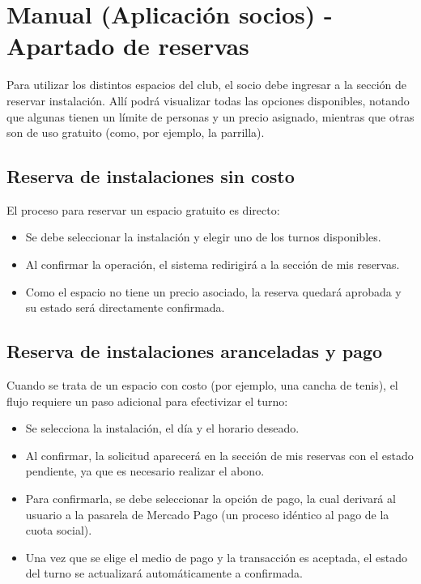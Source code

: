 \section{Manual (Aplicación socios) - Apartado de reservas}

Para utilizar los distintos espacios del club, el socio debe ingresar a la sección de reservar instalación. Allí podrá visualizar todas las opciones disponibles, notando que algunas tienen un límite de personas y un precio asignado, mientras que otras son de uso gratuito (como, por ejemplo, la parrilla).

\subsection{Reserva de instalaciones sin costo}
El proceso para reservar un espacio gratuito es directo:
\begin{itemize}
    \item Se debe seleccionar la instalación y elegir uno de los turnos disponibles.
    \item Al confirmar la operación, el sistema redirigirá a la sección de mis reservas.
    \item Como el espacio no tiene un precio asociado, la reserva quedará aprobada y su estado será directamente confirmada.
\end{itemize}

\subsection{Reserva de instalaciones aranceladas y pago}
Cuando se trata de un espacio con costo (por ejemplo, una cancha de tenis), el flujo requiere un paso adicional para efectivizar el turno:
\begin{itemize}
    \item Se selecciona la instalación, el día y el horario deseado.
    \item Al confirmar, la solicitud aparecerá en la sección de mis reservas con el estado pendiente, ya que es necesario realizar el abono.
    \item Para confirmarla, se debe seleccionar la opción de pago, la cual derivará al usuario a la pasarela de Mercado Pago (un proceso idéntico al pago de la cuota social).
    \item Una vez que se elige el medio de pago y la transacción es aceptada, el estado del turno se actualizará automáticamente a confirmada.
\end{itemize}
